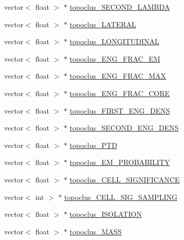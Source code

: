\begin{DoxyCompactItemize}
vector$<$ float $>$ $\ast$ \hyperlink{classJetAnalysisExample_afff63dda3d47f3e9031eca3373060a6e}{topoclus\+\_\+\+S\+E\+C\+O\+N\+D\+\_\+\+L\+A\+M\+B\+DA}
\item 
vector$<$ float $>$ $\ast$ \hyperlink{classJetAnalysisExample_a61e6ef2ec86f9265713d5eee1a5fee08}{topoclus\+\_\+\+L\+A\+T\+E\+R\+AL}
\item 
vector$<$ float $>$ $\ast$ \hyperlink{classJetAnalysisExample_afb7efa5a0dc84afd746b15c5cb13f4a1}{topoclus\+\_\+\+L\+O\+N\+G\+I\+T\+U\+D\+I\+N\+AL}
\item 
vector$<$ float $>$ $\ast$ \hyperlink{classJetAnalysisExample_a9d068106c69c1aed83a6e8f0355dc0e3}{topoclus\+\_\+\+E\+N\+G\+\_\+\+F\+R\+A\+C\+\_\+\+EM}
\item 
vector$<$ float $>$ $\ast$ \hyperlink{classJetAnalysisExample_a74cff7c6eb2ec4284854b830b9e6ef8f}{topoclus\+\_\+\+E\+N\+G\+\_\+\+F\+R\+A\+C\+\_\+\+M\+AX}
\item 
vector$<$ float $>$ $\ast$ \hyperlink{classJetAnalysisExample_a345e050ee1cad1d4526c3810c22bcbd6}{topoclus\+\_\+\+E\+N\+G\+\_\+\+F\+R\+A\+C\+\_\+\+C\+O\+RE}
\item 
vector$<$ float $>$ $\ast$ \hyperlink{classJetAnalysisExample_a4bfc6f414160bd78c88c628f471465a9}{topoclus\+\_\+\+F\+I\+R\+S\+T\+\_\+\+E\+N\+G\+\_\+\+D\+E\+NS}
\item 
vector$<$ float $>$ $\ast$ \hyperlink{classJetAnalysisExample_a2e0163a8f3fbc65df4d432a5cf56f0f7}{topoclus\+\_\+\+S\+E\+C\+O\+N\+D\+\_\+\+E\+N\+G\+\_\+\+D\+E\+NS}
\item 
vector$<$ float $>$ $\ast$ \hyperlink{classJetAnalysisExample_afc95b8f0b107ae3f2eb0027013393a04}{topoclus\+\_\+\+P\+TD}
\item 
vector$<$ float $>$ $\ast$ \hyperlink{classJetAnalysisExample_adc496fcfd4cff6cb33dd15327d9658b2}{topoclus\+\_\+\+E\+M\+\_\+\+P\+R\+O\+B\+A\+B\+I\+L\+I\+TY}
\item 
vector$<$ float $>$ $\ast$ \hyperlink{classJetAnalysisExample_a9699daf3fcf724c89ed995bbf8c240bd}{topoclus\+\_\+\+C\+E\+L\+L\+\_\+\+S\+I\+G\+N\+I\+F\+I\+C\+A\+N\+CE}
\item 
vector$<$ int $>$ $\ast$ \hyperlink{classJetAnalysisExample_ac84bb89f87aea8a5c1c9c58bbb05ae1b}{topoclus\+\_\+\+C\+E\+L\+L\+\_\+\+S\+I\+G\+\_\+\+S\+A\+M\+P\+L\+I\+NG}
\item 
vector$<$ float $>$ $\ast$ \hyperlink{classJetAnalysisExample_ad2d345bf86a78dffe662b64d02587130}{topoclus\+\_\+\+I\+S\+O\+L\+A\+T\+I\+ON}
\item 
vector$<$ float $>$ $\ast$ \hyperlink{classJetAnalysisExample_a6c481ecbb300f1f9400c738912d290a9}{topoclus\+\_\+\+M\+A\+SS}

\end{DoxyCompactItemize}
